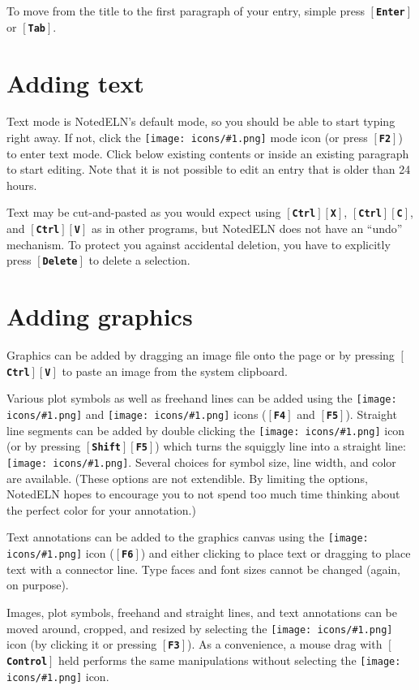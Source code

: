 \documentclass[11pt]{report}
\def\keystroke#1{$\left[\right.\!${\tt\bfseries #1}$\!\left.\right]$}
\def\key#1{\keystroke{#1}}
\def\keycombo#1#2{\keystroke{#1}\keystroke{#2}}
\def\keycontrol#1{\keycombo{Ctrl}{#1}}
\def\keyshift#1{\keycombo{Shift}{#1}}
\def\icon#1{\raise-2pt\hbox{\texttt{[image: icons/\#1.png]}}}
\begin{document}
To move from the title to the first paragraph of your entry, simple
press \key{Enter} or \key{Tab}.

\section{Adding text}

Text mode is NotedELN's default mode, so you should be able to start typing
right away. If not, click the \icon{type} mode icon (or press
\key{F2}) to enter text mode. Click below existing contents or inside
an existing paragraph to start editing. Note that it is not possible
to edit an entry that is older than 24 hours.

Text may be cut-and-pasted as you would expect using
\keycontrol{X}, \keycontrol{C}, and \keycontrol{V} as in other
programs, but NotedELN does not have an ``undo'' mechanism. To protect
you against accidental deletion, you have to explicitly press
\key{Delete} to delete a selection.

\section{Adding graphics}

Graphics can be added by dragging an image file onto the page or by
pressing \keycontrol{V} to paste an image from the system
clipboard. 

Various plot symbols as well as freehand lines can be added using the
\icon{mark} and \icon{squiggle} icons (\key{F4} and
\key{F5}). Straight line segments can be added by double clicking the
\icon{squiggle} icon (or by pressing \keyshift{F5}) which turns the
squiggly line into a straight line: \icon{straight}. Several choices
for symbol size, line width, and color are available.  (These options
are not extendible. By limiting the options, NotedELN hopes to encourage
you to not spend too much time thinking about the perfect color for
your annotation.)

Text annotations can be added to the graphics canvas using the
\icon{note} icon (\key{F6}) and either clicking to place text or
dragging to place text with a connector line. Type faces and font
sizes cannot be changed (again, on purpose).

Images, plot symbols, freehand and straight lines, and text
annotations can be moved around, cropped, and resized by selecting the
\icon{move} icon (by clicking it or pressing \key{F3}). As a
convenience, a mouse drag with \key{Control} held performs the same
manipulations without selecting the \icon{move} icon. 
\end{document}

